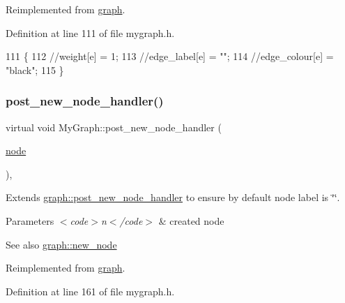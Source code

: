Reimplemented from \mbox{\hyperlink{classgraph_a443182426b461aa9f4b1c9f5ac535179}{graph}}.



Definition at line 111 of file mygraph.\+h.


\begin{DoxyCode}
111                                                \{
112         \textcolor{comment}{//weight[e] = 1;}
113         \textcolor{comment}{//edge\_label[e] = "";}
114         \textcolor{comment}{//edge\_colour[e] = "black";}
115     \}
\end{DoxyCode}
\mbox{\label{class_my_graph_a21153d685303a6d2cfeee913aeb81223}} 
\subsubsection{\texorpdfstring{post\+\_\+new\+\_\+node\+\_\+handler()}{post\_new\_node\_handler()}}
{\footnotesize\ttfamily virtual void My\+Graph\+::post\+\_\+new\+\_\+node\+\_\+handler (\begin{DoxyParamCaption}\item[{\mbox{\hyperlink{classnode}{node}}}]{ }\end{DoxyParamCaption})\hspace{0.3cm}{\ttfamily [inline]}, {\ttfamily [virtual]}}

Extends \mbox{\hyperlink{classgraph_acfe5bc8bdad9fa426750901144319e5f}{graph\+::post\+\_\+new\+\_\+node\+\_\+handler}} to ensure by default node label is \char`\"{}\char`\"{}.


\begin{DoxyParams}{Parameters}
{\em $<$code$>$n$<$/code$>$} & created node \\
\hline
\end{DoxyParams}
\begin{DoxySeeAlso}{See also}
\mbox{\hyperlink{classgraph_ab9505335c20558319b6cce25aed23524}{graph\+::new\+\_\+node}} 
\end{DoxySeeAlso}


Reimplemented from \mbox{\hyperlink{classgraph_acfe5bc8bdad9fa426750901144319e5f}{graph}}.



Definition at line 161 of file mygraph.\+h.


